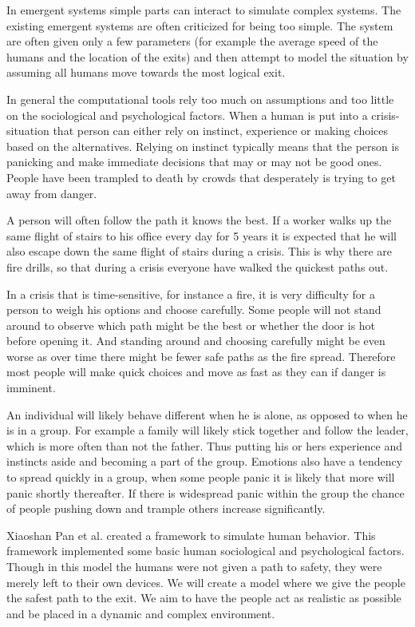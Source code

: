 In emergent systems simple parts can interact to simulate complex systems. The existing emergent systems  
are often criticized for being too simple. The system are often given only a few parameters (for example the  
average speed of the humans and the location of the exits) and then attempt to model the situation by  
assuming all humans move towards the most logical exit. 
 
In general the computational tools rely too much on assumptions and too little on the sociological and psychological  
factors. When a human is put into a crisis-situation that person can either rely on instinct, experience or making  
choices based on the alternatives. Relying on instinct typically means that the person is panicking and make immediate  
decisions that may or may not be good ones. People have been trampled to death by crowds that desperately is trying  
to get away from danger. 
 
A person will often follow the path it knows the best. If a worker walks up the same flight of stairs to his office  
every day for 5 years it is expected that he will also escape down the same flight of stairs during a crisis. This  
is why there are fire drills, so that during a crisis everyone have walked the quickest paths out. 
 
In a crisis that is time-sensitive, for instance a fire, it is very difficulty for a person to weigh his options and  
choose carefully. Some people will not stand around to observe which path might be the best or whether the  
door is hot before opening it. And standing around and choosing carefully might be even worse as  
over time there might be fewer safe paths as the fire spread. Therefore most people will make quick choices 
and move as fast as they can if danger is imminent. 
 
An individual will likely behave different when he is alone, as opposed to when he is in a group. For example  
a family will likely stick together and follow the leader, which is more often than not the father. Thus putting  
his or hers experience and instincts aside and becoming a part of the group. Emotions also have a tendency  
to spread quickly in a group, when some people panic it is likely that more will panic shortly thereafter. If  
there is widespread panic within the group the chance of people pushing down and trample others increase  
significantly. 
 
Xiaoshan Pan et al.\cite{Pan:2007} created a framework to simulate human behavior. This framework implemented some 
basic human sociological and psychological factors. Though in this model the humans were not given a path 
to safety, they were merely left to their own devices. We will create a model where we give the people the 
safest path to the exit. We aim to have the people act as realistic as possible and be placed in a dynamic 
and complex environment.

